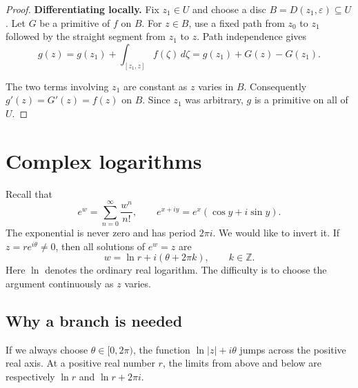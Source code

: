 \documentclass[11pt]{article}
\theoremstyle{plain}
\theoremstyle{definition}
\theoremstyle{remark}
\numberwithin{equation}{section}
\newcommand{\Z}{\mathbb{Z}}
\begin{document}
\begin{proof}
\textbf{Differentiating locally.} Fix $z_1\in U$ and choose a disc
$B=D(z_1,\varepsilon)\subseteq U$. Let $G$ be a primitive of $f$ on
$B$. For $z\in B$, use a fixed path from $z_0$ to $z_1$ followed by
the straight segment from $z_1$ to $z$. Path independence gives
\[
 g(z)=g(z_1)+\int_{[z_1,z]}f(\zeta)\,d\zeta
     =g(z_1)+G(z)-G(z_1).
\]
\begin{center}
\end{center}
The two terms involving $z_1$ are constant as $z$ varies in $B$.
Consequently $g'(z)=G'(z)=f(z)$ on $B$. Since $z_1$ was arbitrary,
$g$ is a primitive on all of $U$.
\end{proof}

\section{Complex logarithms}
Recall that
\[
 e^w=\sum_{n=0}^\infty\frac{w^n}{n!},\qquad
 e^{x+iy}=e^x(\cos y+i\sin y).
\]
The exponential is never zero and has period $2\pi i$. We would like to
invert it. If $z=re^{i\theta}\ne0$, then all solutions of $e^w=z$ are
\[
 w=\ln r+i(\theta+2\pi k),\qquad k\in\Z.
\]
Here $\ln$ denotes the ordinary real logarithm. The difficulty is to
choose the argument continuously as $z$ varies.

\subsection{Why a branch is needed}
If we always choose $\theta\in[0,2\pi)$, the function
$\ln|z|+i\theta$ jumps across the positive real axis. At a positive
real number $r$, the limits from above and below are respectively
$\ln r$ and $\ln r+2\pi i$.
\end{document}
